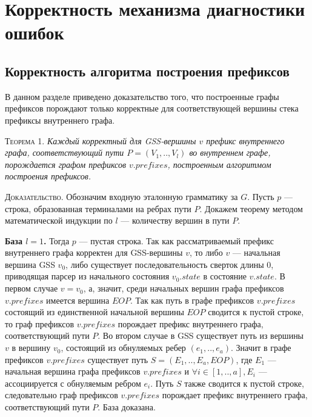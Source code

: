 \section{Корректность механизма диагностики ошибок}
\subsection{Корректность алгоритма построения префиксов}
В данном разделе приведено доказательство того, что построенные графы префиксов порождают только корректные для соответствующей вершины стека префиксы внутреннего графа. 

\textsc{Теорема 1.} 
\textit{Каждый корректный для GSS-вершины $v$ префикс внутреннего графа, соответствующий пути $P = (V_{1},..,V_{l})$ во внутреннем графе, порождается графом префиксов $v.prefixes$, построенным алгоритмом построения префиксов.}

\textsc{Доказательство.}
Обозначим входную эталонную грамматику за $G$. Пусть $p$ --- строка, образованная терминалами на ребрах пути $P$. Докажем теорему методом математической индукции по $l$ --- количеству вершин в пути $P$.

\textbf{База $l = 1$.} Тогда $p$ --- пустая строка. Так как рассматриваемый префикс внутреннего графа корректен для GSS-вершины $v$, то либо $v$ --- начальная вершина GSS $v_{0}$, либо существует последовательность сверток длины 0, приводящая парсер из начального состояния $v_{0}.state$ в состояние $v.state$. В первом случае $v = v_{0}$, а, значит, среди начальных вершин графа префиксов $v.prefixes$ имеется вершина $EOP$. Так как путь в графе префиксов $v.prefixes$ состоящий из единственной начальной вершины $EOP$ сводится к пустой строке, то граф префиксов $v.prefixes$ порождает префикс внутреннего графа, соответствующий пути $P$. Во втором случае в GSS существует путь из вершины $v$ в вершину $v_{0}$, состоящий из обнуляемых ребер $(e_{1},..,e_{a})$. Значит в графе префиксов $v.prefixes$ существует путь $S = (E_{1},..,E_{a}, EOP)$, где $E_{1}$ --- начальная вершина графа префиксов $v.prefixes$ и $\forall i \in [1,..,a], E_{i}$ --- ассоциируется с обнуляемым ребром  $e_{i}$. Путь $S$ также сводится к пустой строке, следовательно граф префиксов $v.prefixes$ порождает префикс внутреннего графа, соответствующий пути $P$. База доказана.
% 


